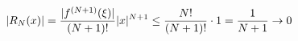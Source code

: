 \documentclass[preview]{standalone}
\begin{document}
\begin{align*}
\special{dvisvgm:raw <g id='unique000'>}|R_N(x)|=\dfrac{|f^{(N+1)}(\xi)|}{(N+1)!}|x|^{N+1}\le\dfrac{N!}{(N+1)!}\cdot 1=\dfrac{1}{N+1}\to 0\special{dvisvgm:raw </g>}
\end{align*}
\end{document}
